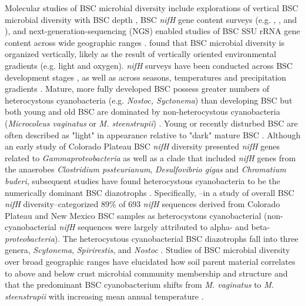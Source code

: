 Molecular studies of BSC microbial diversity include explorations of vertical
BSC microbial diversity with BSC depth \cite{Garcia_Pichel_2003}, BSC
\textit{nifH} gene content surveys (e.g. \citet{14766579}, \citet{Yeager_2012},
\citet{Yeager} and \citet{Steppe_1996}), and next-generation-sequencing (NGS)
enabled studies of BSC SSU rRNA gene content across wide geographic ranges
\cite{Garcia_Pichel_2013, Steven_2013}. \citet{Garcia_Pichel_2003} found that
BSC microbial diversity is organized vertically, likely as the result of
vertically oriented environmental gradients (e.g. light and oxygen).
\textit{nifH} surveys have been conducted across BSC development stages
\cite{14766579}, as well as across seasons, temperatures and precipitation
gradients \cite{Yeager_2012}. Mature, more fully developed BSC possess greater
numbers of heterocystous cyanobacteria (e.g. \textit{Nostoc, Syctonema}) than
developing BSC but both young and old BSC are dominated by non-heterocystous
cyanobacteria (\textit{Microcoleus vaginatus} or \textit{M. steenstrupii})
\cite{14766579, Garcia_Pichel_2013}. Young or recently disturbed BSC are often
described as "light" in appearance relative to "dark" mature BSC
\cite{Belnap_2002}.  Although an early study of Colorado Plateau BSC
\textit{nifH} diversity presented \textit{nifH} genes related to
\textit{Gammaproteobacteria} as well as a clade that included \textit{nifH}
genes from the anaerobes \textit{Clostridium pssteurianum},
\textit{Desulfovibrio gigas} and \textit{Chromatium buderi}, subsequent studies
have found heterocystous cyanobacteria to be the numerically dominant BSC
diazotrophs \cite{Yeager, 14766579, Yeager_2012}. Specifically,
\citet{Yeager}--in a study of overall BSC \textit{nifH} diversity--categorized
89\% of 693 \textit{nifH} sequences derived from Colorado Plateau and New
Mexico BSC samples as heterocystous cyanobacterial (non-cyanobacterial
\textit{nifH} sequences were largely attributed to alpha- and beta-
\textit{proteobacteria}). The heterocystous cyanobacterial BSC diazotrophs fall
into three genera, \textit{Scytonema}, \textit{Spirirestis}, and
\textit{Nostoc} \cite{Yeager, Yeager_2012}. Studies of BSC microbial diversity
over broad geographic ranges have elucidated how soil parent material
correlates to above and below crust microbial community membership and
structure \cite{Steven_2013} and that the predominant BSC cyanobacterium shifts
from \textit{M. vaginatus} to \textit{M. steenstrupii} with increasing mean
annual temperature \cite{Garcia_Pichel_2013}.

